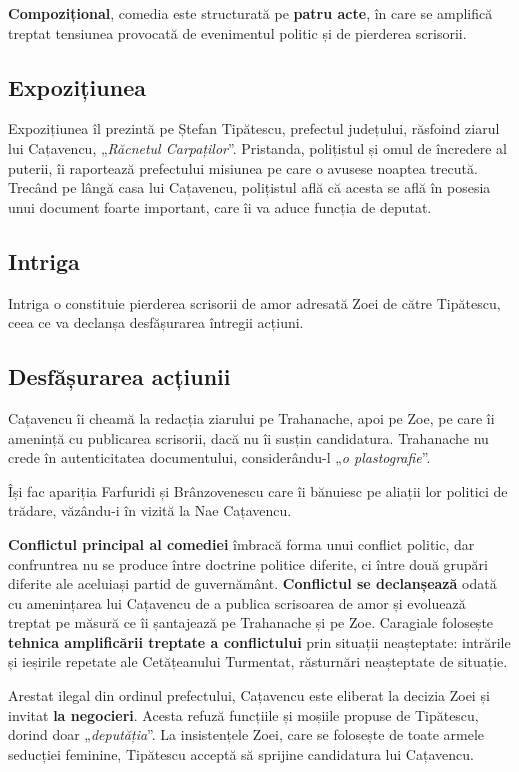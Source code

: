 \documentclass{article}
\newcommand{\qu}[1]{„\emph{#1}”}
\begin{document}
\textbf{Compozițional}, comedia este structurată pe \textbf{patru acte}, în care se amplifică treptat tensiunea provocată de evenimentul politic și de pierderea scrisorii.
\subsection{Expozițiunea}
Expozițiunea îl prezintă pe Ștefan Tipătescu, prefectul județului, răsfoind ziarul lui Cațavencu, \qu{Răcnetul Carpaților}. Pristanda, polițistul și omul de încredere al puterii, îi raportează prefectului misiunea pe care o avusese noaptea trecută. Trecând pe lângă casa lui Cațavencu, polițistul află că acesta se află în posesia unui document foarte important, care îi va aduce funcția de deputat.
\subsection{Intriga}
Intriga o constituie pierderea scrisorii de amor adresată Zoei de către Tipătescu, ceea ce va declanșa desfășurarea întregii acțiuni.
\subsection{Desfășurarea acțiunii}
Cațavencu îi cheamă la redacția ziarului pe Trahanache, apoi pe Zoe, pe care îi amenință cu publicarea scrisorii, dacă nu îi susțin candidatura. Trahanache nu crede în autenticitatea documentului, considerându-l \qu{o plastografie}.

Își fac apariția Farfuridi și Brânzovenescu care îi bănuiesc pe aliații lor politici de trădare, văzându-i în vizită la Nae Cațavencu.

\textbf{Conflictul principal al comediei} îmbracă forma unui conflict politic, dar confruntrea nu se produce între doctrine politice diferite, ci între două grupări diferite ale aceluiași partid de guvernământ. \textbf{Conflictul se declanșează} odată cu amenințarea lui Cațavencu de a publica scrisoarea de amor și evoluează treptat pe măsură ce îi șantajează pe Trahanache și pe Zoe. Caragiale folosește \textbf{tehnica amplificării treptate a conflictului} prin situații neașteptate: intrările și ieșirile repetate ale Cetățeanului Turmentat, răsturnări neașteptate de situație.

Arestat ilegal din ordinul prefectului, Cațavencu este eliberat la decizia Zoei și invitat \textbf{la negocieri}. Acesta refuză funcțiile și moșiile propuse de Tipătescu, dorind doar \qu{deputăția}. La insistențele Zoei, care se folosește de toate armele seducției feminine, Tipătescu acceptă să sprijine candidatura lui Cațavencu.
\end{document}
